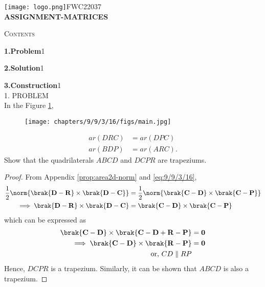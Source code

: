 \documentclass[a4paper,10pt]{report}
\let\vec\mathbf
\begin{document}
\raggedright{\texttt{[image: logo.png]}}\hspace{12.425cm}\raggedleft FWC22037\vspace{2mm}
\\
\centering\Large\textbf{ASSIGNMENT-MATRICES}\vspace{5mm}


\begin{multicols}{2}
\centering \large\textsc{C}\footnotesize\textsc{ontents}\vspace{5mm}
\\
\raggedright\large\textbf{1.\hspace{1cm}Problem}\hspace{3cm}1\vspace{5mm}\\
\raggedright\large\textbf{2.\hspace{1cm}Solution}\hspace{3.1cm}1\vspace{5mm}\\
\raggedright\large\textbf{3.\hspace{1cm}Construction}\hspace{2.1cm}1\vspace{5mm}\\


\centering \large\textsc{1.  P}\footnotesize\textsc{ROBLEM}\vspace{5mm}\\
\fi
In the Figure 
		\ref{fig:9/9/3/16},
	\begin{figure}[H]
		\centering
 \texttt{[image: chapters/9/9/3/16/figs/main.jpg]}
		\caption{}
		\label{fig:9/9/3/16}
  	\end{figure}
	\begin{align}
		\label{eq:9/9/3/16}
		ar(DRC) &= ar(DPC)
		\\
		ar(BDP) &= ar(ARC).
\end{align}
 Show that the quadrilaterals $ABCD$ and $DCPR$ are trapeziums.
\begin{proof}
From Appendix
  \ref{prop:area2d-norm}
 and 
		\eqref{eq:9/9/3/16},
\begin{align}
	\frac{1}{2}\norm{\brak{\vec{D}-\vec{R}} \times \brak{\vec{D}-\vec{C}}}
	&=
	\frac{1}{2}\norm{\brak{\vec{C}-\vec{D}} \times \brak{\vec{C}-\vec{P}}}
	\\
	\implies
	\brak{\vec{D}-\vec{R}}\times \brak{\vec{D}-\vec{C}}  
	&=
	\brak{\vec{C}-\vec{D}} \times \brak{\vec{C}-\vec{P}}
  \end{align}
  which can be expressed as 
  \begin{align}
	\brak{\vec{C}-\vec{D}} \times \brak{\vec{C}-\vec{D}+\vec{R}-\vec{P}} &=\vec{0} 
	\\
\implies 
	\brak{\vec{C}-\vec{D}} \times \brak{\vec{R}-\vec{P}} &=\vec{0} 
	\\
	  \text{or, } CD \parallel RP
  \end{align}
  Hence, $DCPR$ is a trapezium.  Similarly, it can be shown that $ABCD$ is also a trapezium.


\end{proof}
\end{multicols}
\end{document}
